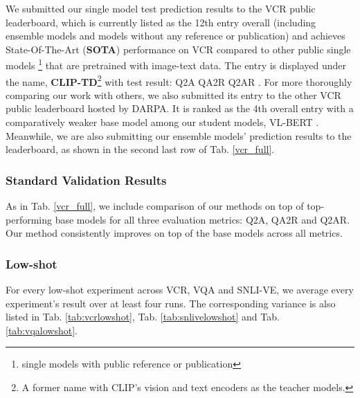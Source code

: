 \documentclass[runningheads]{llncs}
\begin{document}
We submitted our single model test prediction results to the VCR public leaderboard, which is currently listed as the 12th entry overall (including ensemble models and models without any reference or publication) and achieves State-Of-The-Art (\textbf{SOTA}) performance on VCR compared to other public single models \footnote{single models with public reference or publication} that are pretrained with image-text data. The entry is displayed under the name, \textbf{CLIP-TD}\footnote{A former name with CLIP's vision and text encoders as the teacher models.} with test result: Q2A  QA2R  Q2AR . For more thoroughly comparing our work with others, we also submitted its entry to the other VCR public leaderboard hosted by DARPA. It is ranked as the 4th overall entry with a comparatively weaker base model among our student models, VL-BERT \cite{Su2020VL-BERT}. Meanwhile, we are also submitting our ensemble models' prediction results to the leaderboard, as shown in the second last row of Tab. \ref{vcr_full}.


\subsubsection{Standard Validation Results}
\label{sec:vcr-valresults}

As in Tab. \ref{vcr_full}, we include comparison of our methods on top of top-performing base models for all three evaluation metrics: Q2A, QA2R and Q2AR. Our method consistently improves on top of the base models across all metrics.

\subsubsection{Low-shot}
For every low-shot experiment across VCR, VQA and SNLI-VE, we average every experiment's result over at least four runs. The corresponding variance is also listed in Tab. \ref{tab:vcrlowshot}, Tab. \ref{tab:snlivelowshot} and Tab. \ref{tab:vqalowshot}.
\end{document}
